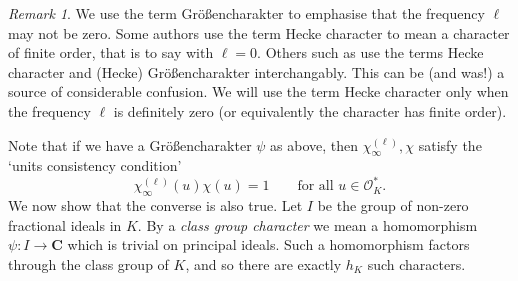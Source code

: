 \documentclass[11pt,reqno]{amsart}
\numberwithin{equation}{section}
\theoremstyle{definition}
\theoremstyle{remark}
\newtheorem*{remark}{Remark}
\newcommand\C{\mathbf{C}}
\renewcommand\O{\mathcal{O}}
\begin{document}
\begin{remark}
We use the term Gr\"o{\ss}encharakter to emphasise that the frequency $\ell$ may not be zero. Some authors use the term Hecke character to mean a character of finite order, that is to say with $\ell = 0$. Others such as \cite{IK-book} use the terms Hecke character and (Hecke) Gr\"o{\ss}encharakter interchangably. This can be (and was!) a source of considerable confusion. We will use the term Hecke character only when the frequency $\ell$ is definitely zero (or equivalently the character has finite order).
\end{remark}

Note that if we have a Gr\"o{\ss}encharakter $\psi$ as above, then $\chi^{(\ell)}_{\infty},\chi$ satisfy the `units consistency condition' \begin{equation}\label{units-consistency}\chi^{(\ell)}_{\infty}(u) \chi(u) = 1 \qquad \mbox{for all $u \in \O_K^*$}.\end{equation} 
We now show that the converse is also true. Let $I$ be the group of non-zero fractional ideals in $K$. By a \emph{class group character} we mean a homomorphism $\psi : I \rightarrow \C$ which is trivial on principal ideals. Such a homomorphism factors through the class group of $K$, and so there are exactly $h_K$ such characters. 
\end{document}
